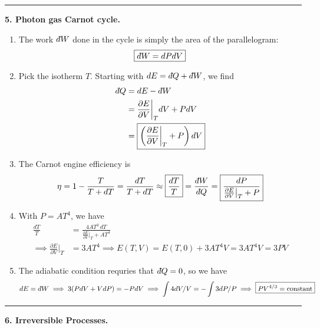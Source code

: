 \documentclass{article}
\theoremstyle{definition}
\newcommand{\p}{\partial}
\def\dbar{{\mkern3mu\mathchar'26\mkern-12mu   d}}
\newcommand{\f}[2]{\frac{#1}{#2}}
\newcommand{\lp}{\left(}
\newcommand{\rp}{\right)}
\begin{document}
\hrule

$\,$\\



\noindent \textbf{5. Photon gas Carnot cycle.} 


\begin{enumerate}[label=(\alph*)]
	\item The work $\dbar W$ done in the cycle is simply the area of the parallelogram:
	\begin{equation*}
	\boxed{\dbar W = dPdV}
	\end{equation*}
	
	
	\item Pick the isotherm $T$. Starting with $dE = \dbar Q + \dbar W$, we find 
	\begin{align*}
	\dbar Q &= dE -  \dbar W \\
	&= \f{\p E}{\p V}\bigg\vert_{T} dV  + PdV \\
	&= \boxed{\lp  \f{\p E}{\p V}\bigg\vert_{T} + P \rp dV}
	\end{align*}
	
	
	\item The Carnot engine efficiency is 
	\begin{equation*}
	\eta = 1 - \f{T}{T+dT} = \f{dT}{T+dT} \approx \boxed{\f{dT}{T}} = \f{\dbar W}{ \dbar Q} = \boxed{\f{dP}{\f{\p E}{\p V}\big\vert_{T} + P }}
	\end{equation*}
	
	
	\item With $P = AT^4$, we have
	\begin{align*}
	\f{dT}{T} &= \f{4AT^3\,dT}{\f{\p E}{\p V}\big\vert_{T} + AT^4 } \\
	\implies \f{\p E}{\p V}\bigg\vert_{T} &= 3AT^4  \implies \boxed{E(T,V)} = E(T,0) + 3AT^4V = \boxed{3AT^4 V} = 3PV
	\end{align*}
	
	
	\item The adiabatic condition requries that $\dbar Q =0$, so we have
	\begin{equation*}
	dE = \dbar W \implies 3(PdV + VdP) = -PdV \implies \int 4dV/V = -\int 3dP/P \implies  \boxed{PV^{4/3} = \text{constant}}
	\end{equation*}
\end{enumerate}


\hrule

$\,$\\



\noindent \textbf{6. Irreversible Processes.}
\end{document}
